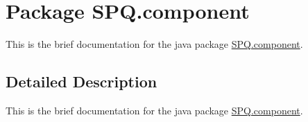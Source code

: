 \hypertarget{namespace_s_p_q_1_1component}{}\section{Package S\+P\+Q.\+component}
\label{namespace_s_p_q_1_1component}


This is the brief documentation for the java package \mbox{\hyperlink{namespace_s_p_q_1_1component}{S\+P\+Q.\+component}}.  




\subsection{Detailed Description}
This is the brief documentation for the java package \mbox{\hyperlink{namespace_s_p_q_1_1component}{S\+P\+Q.\+component}}. 